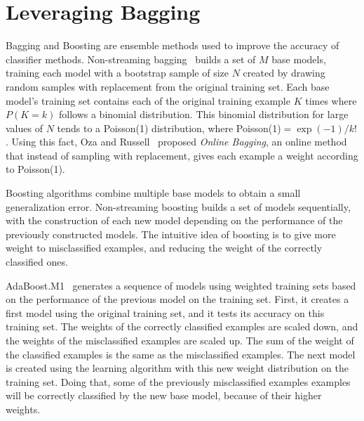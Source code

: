 \chapter{Leveraging Bagging}
\label{ch:leveraging}


Bagging and Boosting are ensemble methods used to improve the accuracy of classifier methods. 
Non-streaming bagging~\cite{bagging} builds a set of  $M$ base models, training each model with a bootstrap sample of size $N$ created by drawing random samples with replacement from the original training set.  Each base model's training set contains each of the original training example $K$ times where $P(K=k)$ follows a binomial distribution. This binomial distribution  for large values of  $N$ tends to a Poisson(1) distribution, where  Poisson(1)$= \exp(-1)/k!$. Using this fact, Oza and Russell~\cite{ozabagboost,ozaexp} proposed {\em Online Bagging}, an online method that instead of sampling with replacement, gives each example a weight according to Poisson(1). 

Boosting algorithms combine multiple base models to obtain a small generalization error.
Non-streaming boosting builds a set of models sequentially, with the construction of each new model depending on the performance of the previously constructed models. The intuitive idea of boosting is to give more weight to misclassified examples, and reducing the weight of the correctly classified ones.

\BEGINOMIT
AdaBoost.M1~\cite{adaboost} generates a sequence of models using weighted training sets based on the performance of the previous model on the training set.  First, it creates a first model using the original training set, and it tests its accuracy on this training set. The weights of the correctly classified examples are scaled down, and the weights of the misclassified examples are scaled up.  The sum of the weight of the classified examples is the same as the misclassified examples. The next model is created using the learning algorithm with this new weight distribution on the training set. Doing that, some of the previously misclassified examples examples will be correctly classified by the new base model, because of their higher weights.
\ENDOMIT

